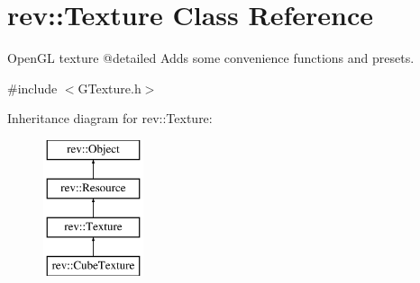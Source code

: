 \hypertarget{classrev_1_1_texture}{}\section{rev\+::Texture Class Reference}
\label{classrev_1_1_texture}


Open\+GL texture @detailed Adds some convenience functions and presets.  




{\ttfamily \#include $<$G\+Texture.\+h$>$}

Inheritance diagram for rev\+::Texture\+:\begin{figure}[H]
\begin{center}
\leavevmode
\includegraphics[height=4.000000cm]{classrev_1_1_texture}
\end{center}
\end{figure}

